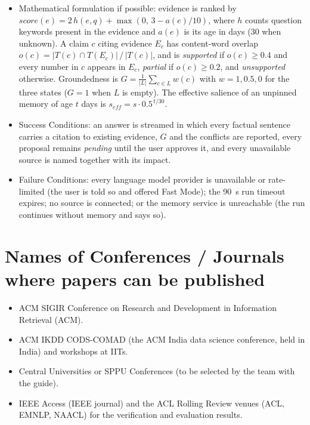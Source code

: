 \documentclass[oneside,a4paper,12pt]{report}
\begin{document}
\begin{itemize}
\item Mathematical formulation if possible: evidence is ranked by $\mathit{score}(e) = 2\,h(e, q) + \max(0,\, 3 - a(e)/10)$, where $h$ counts question keywords present in the evidence and $a(e)$ is its age in days (30 when unknown). A claim $c$ citing evidence $E_c$ has content-word overlap $o(c) = |T(c) \cap T(E_c)| \,/\, |T(c)|$, and is \emph{supported} if $o(c) \ge 0.4$ and every number in $c$ appears in $E_c$, \emph{partial} if $o(c) \ge 0.2$, and \emph{unsupported} otherwise. Groundedness is $G = \frac{1}{|L|}\sum_{c \in L} w(c)$ with $w = 1, 0.5, 0$ for the three states ($G = 1$ when $L$ is empty). The effective salience of an unpinned memory of age $t$ days is $s_{\mathit{eff}} = s \cdot 0.5^{\,t/30}$.
\item Success Conditions: an answer is streamed in which every factual sentence carries a citation to existing evidence, $G$ and the conflicts are reported, every proposal remains \emph{pending} until the user approves it, and every unavailable source is named together with its impact.
\item Failure Conditions: every language model provider is unavailable or rate-limited (the user is told so and offered Fast Mode); the 90~s run timeout expires; no source is connected; or the memory service is unreachable (the run continues without memory and says so).
\end{itemize}


\section{Names of Conferences / Journals where papers can be published}
\begin{itemize}
\item  ACM SIGIR Conference on Research and Development in Information Retrieval (ACM).
\item  ACM IKDD CODS-COMAD (the ACM India data science conference, held in India) and workshops at IITs.
\item  Central Universities or SPPU Conferences (to be selected by the team with the guide).
\item IEEE Access (IEEE journal) and the ACL Rolling Review venues (ACL, EMNLP, NAACL) for the verification and evaluation results.
\end{itemize}
\end{document}
